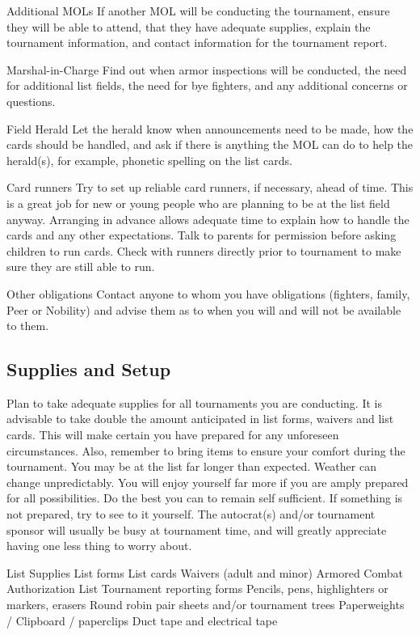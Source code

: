 \documentclass{article}
\begin{document}
Additional MOLs If another MOL will be conducting the tournament, ensure they will
be able to attend, that they have adequate supplies, explain the
tournament information, and contact information for the tournament
report.

Marshal-in-Charge Find out when armor inspections will be conducted, the need for
additional list fields, the need for bye fighters, and any additional
concerns or questions.

Field Herald Let the herald know when announcements need to be made, how the
cards should be handled, and ask if there is anything the MOL can
do to help the herald(s), for example, phonetic spelling on the list
cards.

Card runners Try to set up reliable card runners, if necessary, ahead of time. This
is a great job for new or young people who are planning to be at the
list field anyway. Arranging in advance allows adequate time to
explain how to handle the cards and any other expectations. Talk to
parents for permission before asking children to run cards. Check
with runners directly prior to tournament to make sure they are still
able to run.

Other obligations Contact anyone to whom you have obligations (fighters, family, Peer
or Nobility) and advise them as to when you will and will not be
available to them.

\subsection{Supplies and Setup}
Plan to take adequate supplies for all tournaments you are conducting. It is advisable to take double the
amount anticipated in list forms, waivers and list cards. This will make certain you have prepared for any
unforeseen circumstances.
Also, remember to bring items to ensure your comfort during the tournament. You may be at the list far
longer than expected. Weather can change unpredictably. You will enjoy yourself far more if you are
amply prepared for all possibilities.
Do the best you can to remain self sufficient. If something is not prepared, try to see to it yourself. The
autocrat(s) and/or tournament sponsor will usually be busy at tournament time, and will greatly appreciate
having one less thing to worry about.



List Supplies
List forms
List cards
Waivers (adult and minor)
Armored Combat Authorization List
Tournament reporting forms
Pencils, pens, highlighters or markers, erasers
Round robin pair sheets and/or tournament trees
Paperweights / Clipboard / paperclips
Duct tape and electrical tape
\end{document}
